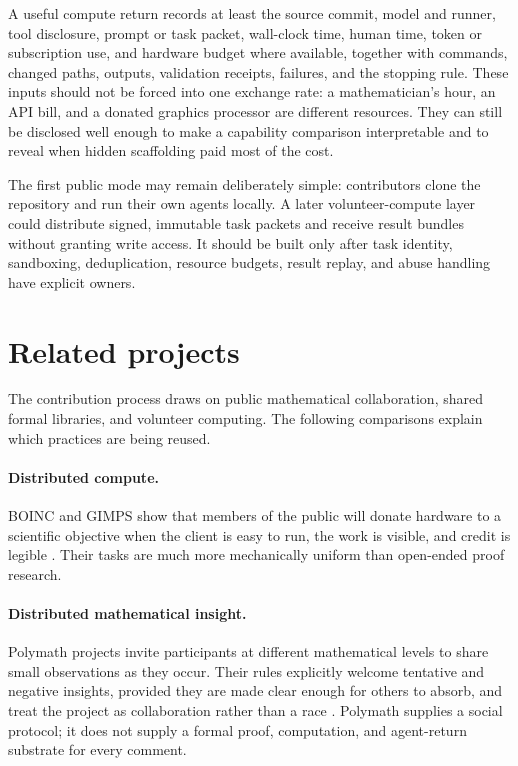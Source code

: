 \documentclass[10pt]{article}
\begin{document}
A useful compute return records at least the source commit, model and runner,
tool disclosure, prompt or task packet, wall-clock time, human time, token or
subscription use, and hardware budget where available, together with commands,
changed paths, outputs, validation receipts, failures, and the stopping rule.
These inputs should not be forced into one exchange rate: a mathematician's
hour, an API bill, and a donated graphics processor are different resources.
They can still be disclosed well enough to make a capability comparison
interpretable and to reveal when hidden scaffolding paid most of the cost.

The first public mode may remain deliberately simple: contributors clone the
repository and run their own agents locally.  A later volunteer-compute layer
could distribute signed, immutable task packets and receive result bundles
without granting write access.  It should be built only after task identity,
sandboxing, deduplication, resource budgets, result replay, and abuse handling
have explicit owners.

\section{Related projects}\label{sec:prior}

The contribution process draws on public mathematical collaboration, shared
formal libraries, and volunteer computing. The following comparisons explain
which practices are being reused.

\paragraph{Distributed compute.}
BOINC and GIMPS show that members of the public will donate hardware to a
scientific objective when the client is easy to run, the work is visible, and
credit is legible \cite{boinc,gimps}.  Their tasks are much more mechanically
uniform than open-ended proof research.

\paragraph{Distributed mathematical insight.}
Polymath projects invite participants at different mathematical levels to
share small observations as they occur.  Their rules explicitly welcome
tentative and negative insights, provided they are made clear enough for
others to absorb, and treat the project as collaboration rather than a race
\cite{polymath}.  Polymath supplies a social protocol; it does not supply a
formal proof, computation, and agent-return substrate for every comment.
\end{document}

